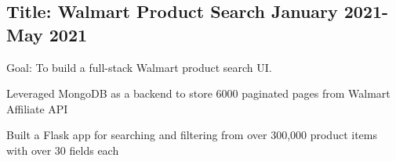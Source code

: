 \documentclass[11pt]{article}
\begin{document}
\subsection*{Title: Walmart Product Search \hfill {\normalfont January 2021-May 2021}}
\noindent
\href{https://github.com/Anthonyive/DSCI-551-Project.git}{} Goal: To build a full-stack Walmart product search UI.
\begin{compactitem}
    \item Leveraged MongoDB as a backend to store 6000 paginated pages from Walmart
    Affiliate API
    \item Built a Flask app for searching and filtering from over 300,000
    product items with over 30 fields each
\end{compactitem}


\end{document}
